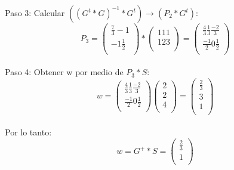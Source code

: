 \documentclass[
	11pt, %
]{beamer}
\begin{document}
\begin{frame}
  Paso 3: Calcular $((G^{t}*G)^{-1}*G^{t}) \rightarrow (P_{2}*G^{t})$:\\
  
  \[P_{3} = \begin{pmatrix}
    \frac{7}{3} -1\\
    -1  \frac{1}{2}\\
  \end{pmatrix} * \begin{pmatrix}
    1 1 1\\
    1 2 3\\
  \end{pmatrix} = \begin{pmatrix}
    \frac{4}{3} \frac{1}{3} \frac{-2}{3}\\
    \frac{-1}{2} 0 \frac{1}{2}\\
  \end{pmatrix}\]\\

  Paso 4: Obtener w por medio de $P_{3}*S:$ \\

  \[ w = \begin{pmatrix}
    \frac{4}{3} \frac{1}{3}  \frac{-2}{3}\\
    \frac{-1}{2} 0  \frac{1}{2}\\
  \end{pmatrix} \begin{pmatrix}
    2\\
    2\\
    4\\
  \end{pmatrix} = \begin{pmatrix}
    \frac{2}{3}\\
    3\\
    1\\
  \end{pmatrix}
  \]\\

  Por lo tanto:   \[w = G^{+} * S = \begin{pmatrix}
    \frac{2}{3}\\
    1\\
  \end{pmatrix}\]
\end{frame}
\end{document}
